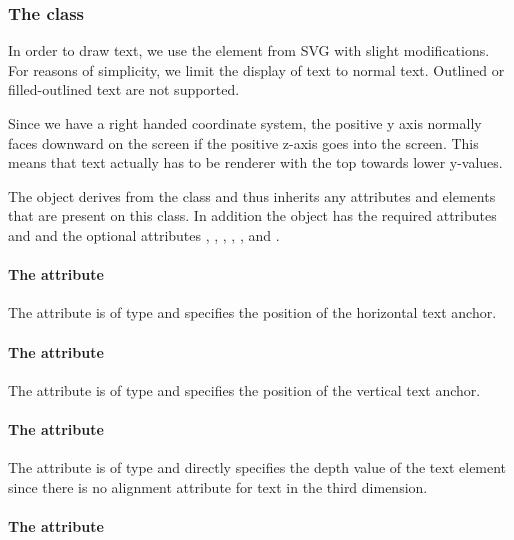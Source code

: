 \subsubsection{The  class}
\label{text-class}

In order to draw text, we use the  element from SVG with slight 
modifications. For reasons of simplicity, we limit the display of text to normal 
text. Outlined or filled-outlined text are not supported.

Since we have a right handed coordinate system, the positive y axis normally 
faces downward on the screen if the positive z-axis goes into the screen. This 
means that text actually has to be renderer with the top towards lower y-values.


The \Text object derives from the \GraphicalPrimitiveOneD class and thus
inherits any attributes and elements that are present on this class.
In addition the \Text object has the required attributes  and  
and the optional attributes , , , 
, ,  and 
.

\paragraph{The \fixttspace{} attribute}

The  attribute is of type
\RelAbsVector and specifies the position of the horizontal text anchor.

\paragraph{The \fixttspace{} attribute}

The  attribute is of type
\RelAbsVector and specifies the position of the vertical text anchor.

\paragraph{The \fixttspace{} attribute}

The  attribute is of type
\RelAbsVector and directly specifies the depth value of the text element since 
there is no alignment attribute for text in the third dimension.

\paragraph{The \fixttspace{} attribute}

